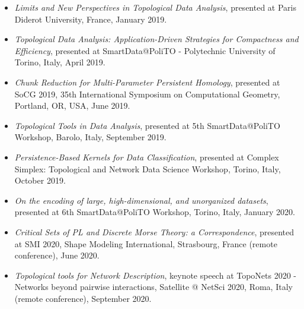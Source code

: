 \documentclass[11pt]{article}
\begin{document}
\begin{itemize}
\item {\em Limits and New Perspectives in Topological Data Analysis}, presented at Paris Diderot University, France, January 2019.

\item {\em Topological Data Analysis: Application-Driven Strategies for Compactness and Efficiency}, presented at SmartData@PoliTO - Polytechnic University of Torino, Italy, April 2019.

\item {\em Chunk Reduction for Multi-Parameter Persistent Homology}, presented at SoCG 2019, 35th International Symposium on Computational Geometry, Portland, OR, USA, June 2019.

\item {\em Topological Tools in Data Analysis}, presented at 5th SmartData@PoliTO Workshop, Barolo, Italy, September 2019.

\item {\em Persistence-Based Kernels for Data Classification}, presented at Complex Simplex: Topological and Network Data Science Workshop, Torino, Italy, October 2019.

\item {\em On the encoding of large, high-dimensional, and unorganized datasets}, presented at 6th SmartData@PoliTO Workshop, Torino, Italy, January 2020.


\item {\em Critical Sets of PL and Discrete Morse Theory: a Correspondence}, presented at SMI 2020, Shape Modeling International, Strasbourg, France (remote conference), June 2020.


\item {\em Topological tools for Network Description}, keynote speech at TopoNets 2020 - Networks beyond pairwise interactions, Satellite @ NetSci 2020, Roma, Italy (remote conference), September 2020.



\end{itemize}
\end{document}
